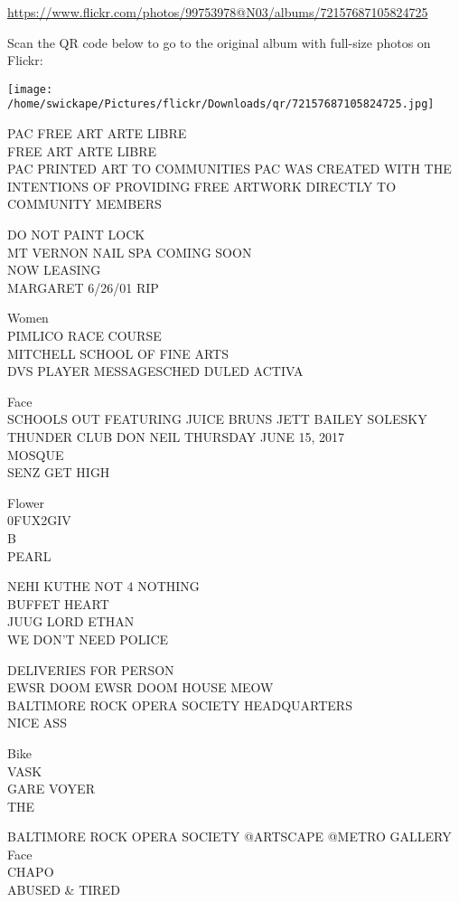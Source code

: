 \documentclass[10pt,letterpaper]{article}
\begin{document}
\url{https://www.flickr.com/photos/99753978@N03/albums/72157687105824725}

Scan the QR code below to go to the original album with full-size photos on Flickr:

\texttt{[image: /home/swickape/Pictures/flickr/Downloads/qr/72157687105824725.jpg]}


PAC FREE ART ARTE LIBRE\\
FREE ART ARTE LIBRE\\
PAC PRINTED ART TO COMMUNITIES PAC WAS CREATED WITH THE INTENTIONS OF PROVIDING FREE ARTWORK DIRECTLY TO COMMUNITY MEMBERS

DO NOT PAINT LOCK\\
MT VERNON NAIL SPA COMING SOON\\
NOW LEASING\\
MARGARET 6/26/01 RIP

Women\\
PIMLICO RACE COURSE\\
MITCHELL SCHOOL OF FINE ARTS\\
DVS PLAYER MESSAGESCHED DULED ACTIVA

Face\\
SCHOOLS OUT FEATURING JUICE BRUNS JETT BAILEY SOLESKY THUNDER CLUB DON NEIL THURSDAY JUNE 15, 2017\\
MOSQUE\\
SENZ GET HIGH

Flower\\
0FUX2GIV\\
B\\
PEARL

NEHI KUTHE NOT 4 NOTHING\\
BUFFET HEART\\
JUUG LORD ETHAN\\
WE DON'T NEED POLICE

DELIVERIES FOR PERSON\\
EWSR DOOM EWSR DOOM HOUSE MEOW\\
BALTIMORE ROCK OPERA SOCIETY HEADQUARTERS\\
NICE ASS

Bike\\
VASK\\
GARE VOYER\\
THE

BALTIMORE ROCK OPERA SOCIETY @ARTSCAPE @METRO GALLERY\\
Face\\
CHAPO\\
ABUSED \& TIRED
\end{document}
